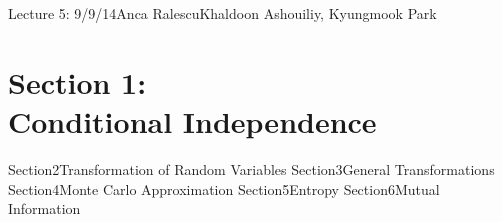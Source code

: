 \documentclass[11pt]{extarticle}
\newenvironment{Section}[2]{
  \section*{\huge{Section #1:\\ #2}}
}
\newcommand{\lecture}[4]{
   \pagestyle{myheadings}
   \thispagestyle{plain}
   \newpage
   \setcounter{page}{1}
   \noindent
   \begin{center}
   \framebox{
      \vbox{\vspace{2mm}
    \hbox to 6.28in { {\bf 20CS6037 Machine Learning \hfill} }
       \vspace{6mm}
       \hbox to 6.28in { {\Large \hfill #1 (#2)  \hfill} }
       \vspace{6mm}
       \hbox to 6.28in { {\it Lecturer: #3 \hfill Scribes: #4} }
      \vspace{2mm}}
   }
   \end{center}
   \markboth{#1}{#1}
   \vspace*{4mm}
}
\begin{document}
 {Lecture 5: 9/9/14}{Anca Ralescu}{Khaldoon Ashouiliy, Kyungmook Park}

\begin{Section}{1}{Conditional Independence}
\end{Section}
\begin{Section}{2}{Transformation of Random Variables}
\end{Section}
\begin{Section}{3}{General Transformations}
\end{Section}
\begin{Section}{4}{Monte Carlo Approximation}
\end{Section}
\begin{Section}{5}{Entropy}
\end{Section}
\begin{Section}{6}{Mutual Information}
\end{Section}



\newpage
\end{document}
